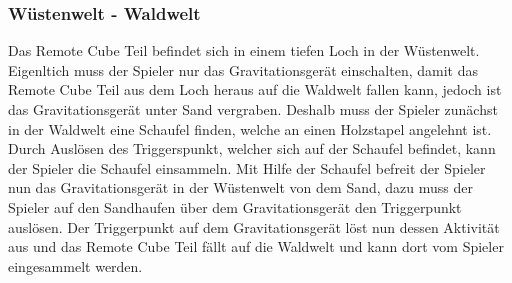 \subsubsection{Wüstenwelt - Waldwelt}
Das Remote Cube Teil befindet sich in einem tiefen Loch in der Wüstenwelt. Eigenltich muss der Spieler nur das Gravitationsgerät einschalten, damit das Remote Cube Teil aus dem Loch heraus auf die Waldwelt fallen kann, jedoch ist das Gravitationsgerät unter Sand vergraben. Deshalb muss der Spieler zunächst in der Waldwelt eine Schaufel finden, welche an einen Holzstapel angelehnt ist. Durch Auslösen des Triggerspunkt, welcher sich auf der Schaufel befindet, kann der Spieler die Schaufel einsammeln. Mit Hilfe der Schaufel befreit der Spieler nun das Gravitationsgerät in der Wüstenwelt von dem Sand, dazu muss der Spieler auf den Sandhaufen über dem Gravitationsgerät den Triggerpunkt auslösen. Der Triggerpunkt auf dem Gravitationsgerät löst nun dessen Aktivität aus und das Remote Cube Teil fällt auf die Waldwelt und kann dort vom Spieler eingesammelt werden.